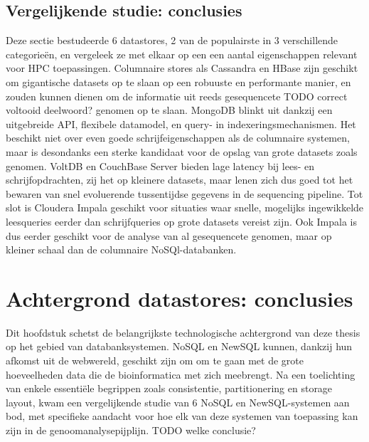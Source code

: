 \subsection*{Vergelijkende studie: conclusies}

Deze sectie bestudeerde 6 datastores, 2 van de populairste in 3 verschillende categorie\"en, en vergeleek ze met elkaar op een een aantal eigenschappen relevant voor HPC toepassingen. Columnaire stores als Cassandra en HBase zijn geschikt om gigantische datasets op te slaan op een robuuste en performante manier, en zouden kunnen dienen om de informatie uit reeds gesequencete %
{\color{red} TODO correct voltooid deelwoord?} genomen op te slaan. MongoDB blinkt uit dankzij een uitgebreide API, flexibele datamodel, en query- in indexeringsmechanismen. Het beschikt niet over even goede schrijfeigenschappen als de columnaire systemen, maar is desondanks een sterke kandidaat voor de opslag van grote datasets zoals genomen. VoltDB en CouchBase Server bieden lage latency bij lees- en schrijfopdrachten, zij het op kleinere datasets, maar lenen zich dus goed tot het bewaren van snel evoluerende tussentijdse gegevens in de sequencing pipeline. Tot slot is Cloudera Impala geschikt voor situaties waar snelle, mogelijks ingewikkelde leesqueries eerder dan schrijfqueries op grote datasets vereist zijn. Ook Impala is dus eerder geschikt voor de analyse van al gesequencete genomen, maar op kleiner schaal dan de columnaire NoSQl-databanken.

\section*{Achtergrond datastores: conclusies}

Dit hoofdstuk schetst de belangrijkste technologische achtergrond van deze thesis op het gebied van databanksystemen. NoSQL en NewSQL kunnen, dankzij hun afkomst uit de webwereld, geschikt zijn om om te gaan met de grote hoeveelheden data die de bioinformatica met zich meebrengt. Na een toelichting van enkele essenti\"ele begrippen zoals consistentie, partitionering en storage layout, kwam een vergelijkende studie van 6 NoSQL en NewSQL-systemen aan bod, met specifieke aandacht voor hoe elk van deze systemen van toepassing kan zijn in de genoomanalysepijplijn.
{\color{red} TODO welke conclusie?} %
